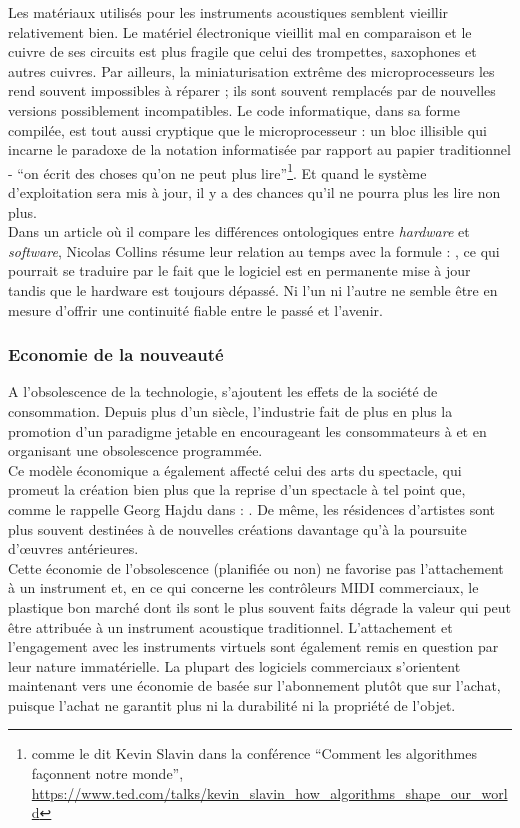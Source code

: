 \noindent Les matériaux utilisés pour les instruments acoustiques semblent vieillir relativement bien. Le matériel électronique vieillit mal en comparaison et le cuivre de ses circuits est plus fragile que celui des trompettes, saxophones et autres cuivres. Par ailleurs, la miniaturisation extrême des microprocesseurs les rend souvent impossibles à réparer ; ils sont souvent remplacés par de nouvelles versions possiblement incompatibles. Le code informatique, dans sa forme compilée, est tout aussi cryptique que le microprocesseur : un bloc illisible qui incarne le paradoxe de la notation informatisée par rapport au papier traditionnel - ``on écrit des choses qu'on ne peut plus lire''\footnote{comme le dit Kevin Slavin dans la conférence ``Comment les algorithmes façonnent notre monde'', \url{https://www.ted.com/talks/kevin_slavin_how_algorithms_shape_our_world}}. Et quand le système d'exploitation sera mis à jour, il y a des chances qu'il ne pourra plus les lire non plus.\\
\indent Dans un article où il compare les différences ontologiques entre \textit{hardware} et \textit{software}, Nicolas Collins \cite{collins_semiconducting_2013} résume leur relation au temps avec la formule : , ce qui pourrait se traduire par le fait que le logiciel est en permanente mise à jour tandis que le hardware est toujours dépassé. Ni l'un ni l'autre ne semble être en mesure d'offrir une continuité fiable entre le passé et l'avenir.

	
\subsubsection{Economie de la nouveauté}

\noindent A l'obsolescence de la technologie, s'ajoutent les effets de la société de consommation. Depuis plus d'un siècle, l'industrie fait de plus en plus la promotion d'un paradigme jetable en encourageant les consommateurs à  \cite{slade_made_made_2006} et en organisant une obsolescence programmée.\\
\indent Ce modèle économique a également affecté celui des arts du spectacle, qui promeut la création bien plus que la reprise d'un spectacle à tel point que, comme le rappelle Georg Hajdu dans \cite{hajdu_disposable_2016} : . De même, les résidences d'artistes sont plus souvent destinées à de nouvelles créations davantage qu'à la poursuite d'œuvres antérieures.\\
\indent Cette économie de l'obsolescence (planifiée ou non) ne favorise pas l'attachement à un instrument et, en ce qui concerne les contrôleurs MIDI commerciaux, le plastique bon marché dont ils sont le plus souvent faits dégrade la valeur qui peut être attribuée à un instrument acoustique traditionnel. L'attachement et l'engagement avec les instruments virtuels sont également remis en question par leur nature immatérielle. La plupart des logiciels commerciaux s'orientent maintenant vers une économie de basée sur l'abonnement plutôt que sur l'achat, puisque l'achat ne garantit plus ni la durabilité ni la propriété de l'objet.


